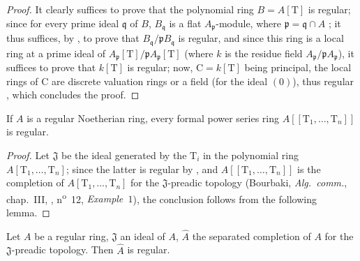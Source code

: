 \begin{proof}
It clearly suffices to prove that the polynomial ring $B=A[\mathrm{T}]$ is regular;
since for every prime ideal $\mathfrak{q}$ of $B$, $B_\mathfrak{q}$ is a flat $A_\mathfrak{p}$-module, where $\mathfrak{p}=\mathfrak{q}\cap A$ ;
it thus suffices, by , to prove that $B_\mathfrak{q}/\mathfrak{p}B_\mathfrak{q}$ is regular, and since this ring is a local ring at a prime ideal of $A_\mathfrak{p}[\mathrm{T}]/\mathfrak{p}A_\mathfrak{p}[\mathrm{T}]$ (where $k$ is the residue field $A_\mathfrak{p}/\mathfrak{p}A_\mathfrak{p}$), it suffices to prove that $k[\mathrm{T}]$ is regular;
now, $\mathrm{C}=k[\mathrm{T}]$ being principal, the local rings of $\mathrm{C}$ are discrete valuation rings or a field (for the ideal $(0)$), thus regular , which concludes the proof.
\end{proof}

\begin{corollary}[17.3.8]
\label{0.17.3.8}
If $A$ is a regular Noetherian ring, every formal power series ring $A[[\mathrm{T}_1,\ldots,\mathrm{T}_n]]$ is regular.
\end{corollary}

\begin{proof}
Let $\mathfrak{J}$ be the ideal generated by the $\mathrm{T}_i$ in the polynomial ring $A[\mathrm{T}_1,\ldots,\mathrm{T}_n]$;
since the latter is regular by , and $A[[\mathrm{T}_1,\ldots,\mathrm{T}_n]]$ is the completion of $A[\mathrm{T}_1,\ldots,\mathrm{T}_n]$ for the $\mathfrak{J}$-preadic topology (Bourbaki, \emph{Alg.~comm.}, chap.~III, , n\textsuperscript{o}~12, \emph{Example~$1$}), the conclusion follows from the following lemma.
\end{proof}

\begin{lemma}[17.3.8.1]
\label{0.17.3.8.1}
Let $A$ be a regular ring, $\mathfrak{J}$ an ideal of $A$, $\widehat{A}$ the separated completion of $A$ for the $\mathfrak{J}$-preadic topology.
Then $\widehat{A}$ is regular.
\end{lemma}

